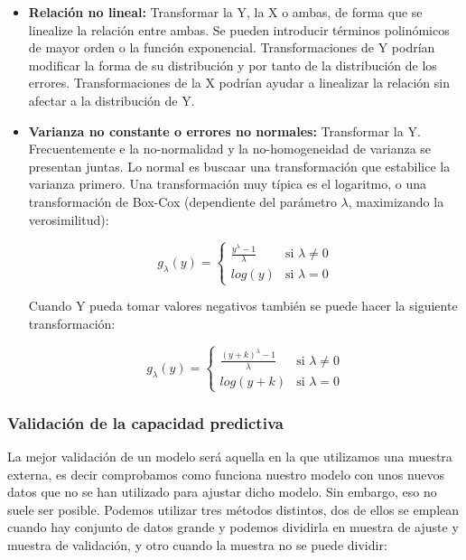 \begin{itemize}
    \item \textbf{Relación no lineal: }Transformar la Y, la X o ambas, de forma que se linealize la relación entre ambas. Se pueden introducir términos polinómicos de mayor orden o la función exponencial.
    Transformaciones de Y podrían modificar la forma de su distribución y por tanto de la distribución de los errores. Transformaciones de la X podrían ayudar a linealizar la relación sin afectar a la distribución de Y.
    \item \textbf{Varianza no constante o errores no normales: }Transformar la Y. Frecuentemente e la no-normalidad y la no-homogeneidad de varianza se presentan juntas. Lo normal es buscaar una transformación que estabilice la varianza primero.
    Una transformación muy típica es el logaritmo, o una transformación de Box-Cox (dependiente del parámetro $\lambda$, maximizando la verosimilitud):

    $$
    g_\lambda(y)=\begin{cases}
        \frac{y^\lambda-1}{\lambda} & \text{si }\lambda\neq0\\
        log(y) & \text{si }\lambda=0
    \end{cases}
    $$

    Cuando Y pueda tomar valores negativos también se puede hacer la siguiente transformación:

    $$
    g_\lambda(y)=\begin{cases}
        \frac{(y+k)^\lambda-1}{\lambda} & \text{si }\lambda\neq0\\
        log(y+k) & \text{si }\lambda=0
    \end{cases}
    $$

\end{itemize}

\subsubsection{Validación de la capacidad predictiva}

La mejor validación de un modelo será aquella en la que utilizamos una muestra externa, es decir comprobamos como funciona nuestro modelo con unos nuevos datos que no se han utilizado para ajustar dicho modelo.
Sin embargo, eso no suele ser posible. Podemos utilizar tres métodos distintos, dos de ellos se emplean cuando hay conjunto de datos grande y podemos dividirla en muestra de ajuste y muestra de validación, y otro cuando la muestra no se puede dividir:

